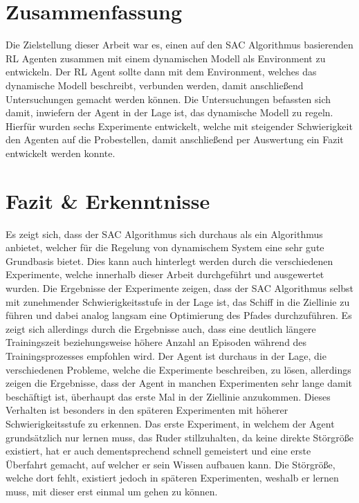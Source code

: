 \documentclass[]{iat}
\begin{document}
\section{Zusammenfassung}
Die Zielstellung dieser Arbeit war es, einen auf den SAC Algorithmus basierenden RL Agenten zusammen mit einem dynamischen Modell als Environment zu entwickeln. Der RL Agent sollte dann mit dem Environment, welches das dynamische Modell beschreibt, verbunden werden, damit anschließend Untersuchungen gemacht werden können. Die Untersuchungen befassten sich damit, inwiefern der Agent in der Lage ist, das dynamische Modell zu regeln. Hierfür wurden sechs Experimente entwickelt, welche mit steigender Schwierigkeit den Agenten auf die Probestellen, damit anschließend per Auswertung ein Fazit entwickelt werden konnte.

\section{Fazit \& Erkenntnisse}
Es zeigt sich, dass der SAC Algorithmus sich durchaus als ein Algorithmus anbietet, welcher für die Regelung von dynamischem System eine sehr gute Grundbasis bietet. Dies kann auch hinterlegt werden durch die verschiedenen Experimente, welche innerhalb dieser Arbeit durchgeführt und ausgewertet wurden. Die Ergebnisse der Experimente zeigen, dass der SAC Algorithmus selbst mit zunehmender Schwierigkeitsstufe in der Lage ist, das Schiff in die Ziellinie zu führen und dabei analog langsam eine Optimierung des Pfades durchzuführen. Es zeigt sich allerdings durch die Ergebnisse auch, dass eine deutlich längere Trainingszeit beziehungsweise höhere Anzahl an Episoden während des Trainingsprozesses empfohlen wird. Der Agent ist durchaus in der Lage, die verschiedenen Probleme, welche die Experimente beschreiben, zu lösen, allerdings zeigen die Ergebnisse, dass der Agent in manchen Experimenten sehr lange damit beschäftigt ist, überhaupt das erste Mal in der Ziellinie anzukommen. Dieses Verhalten ist besonders in den späteren Experimenten mit höherer Schwierigkeitsstufe zu erkennen. Das erste Experiment, in welchem der Agent grundsätzlich nur lernen muss, das Ruder stillzuhalten, da keine direkte Störgröße existiert, hat er auch dementsprechend schnell gemeistert und eine erste Überfahrt gemacht, auf welcher er sein Wissen aufbauen kann. Die Störgröße, welche dort fehlt, existiert jedoch in späteren Experimenten, weshalb er lernen muss, mit dieser erst einmal um gehen zu können.
\end{document}
